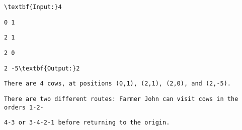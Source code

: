 \begin{verbatim}
\textbf{Input:}4 \end{verbatim}
\begin{verbatim}
0 1\end{verbatim}
\begin{verbatim}
2 1 \end{verbatim}
\begin{verbatim}
2 0 \end{verbatim}
\begin{verbatim}
2 -5\textbf{Output:}2\end{verbatim}
\begin{verbatim}
There are 4 cows, at positions (0,1), (2,1), (2,0), and (2,-5).\end{verbatim}
\begin{verbatim}
There are two different routes: Farmer John can visit cows in the orders 1-2-\end{verbatim}
\begin{verbatim}
4-3 or 3-4-2-1 before returning to the origin.\end{verbatim}